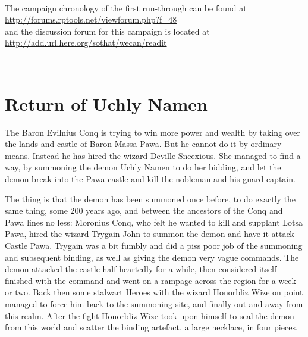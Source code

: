 \documentclass[11pt, twoside, titlepage, a4paper]{report}
\begin{document}
\

The campaign chronology of the first run-through can be found at \\
\url{http://forums.rptools.net/viewforum.php?f=48} \\
and the discussion forum for this campaign is located at \\ \url{http://add.url.here.org/sothat/wecan/readit}

\


%
%
%
%






\clearpage
\section*{Return of Uchly Namen}

The Baron Evilnius Conq is trying to win more power and wealth by taking over the lands and castle of Baron Massa Pawa. But he cannot do it by ordinary means. Instead he has hired the wizard Deville Sneexious.
She managed to find a way, by summoning the demon Uchly Namen to do her bidding, and let the demon break into the Pawa castle and kill the nobleman and his guard captain.

The thing is that the demon has been summoned once before, to do exactly the same thing, some 200 years ago, and between the ancestors of the Conq and Pawa lines no less: Moronius Conq, who felt he wanted to kill and supplant Lotsa Pawa, hired the wizard Trygain John to summon the demon and have it attack Castle Pawa. Trygain was a bit fumbly and did a piss poor job of the summoning and subsequent binding, as well as giving the demon very vague commands. The demon attacked the castle half-heartedly for a while, then considered itself finished with the command and went on a rampage across the region for a week or two. Back then some stalwart Heroes with the wizard Honorbliz Wize on point managed to force him back to the summoning site, and finally out and away from this realm. After the fight Honorbliz Wize took upon himself to seal the demon from this world and scatter the binding artefact, a large necklace, in four pieces.
\end{document}
